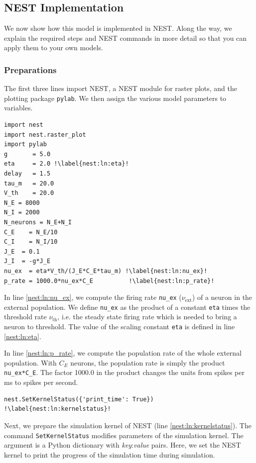 \documentclass{article}
\begin{document}
\subsection{NEST Implementation}\label{nest:sec:brunel_impl}

We now show how this model is implemented in NEST. Along the way, we
explain the required steps and NEST commands in more detail so that
you can apply them to your own models.

\subsubsection{Preparations}
The first three lines import NEST, a NEST module for raster plots, and
the plotting package \lstinline!pylab!. We then assign the various model
parameters to variables.
\begin{lstlisting}[name=Brunel_interactive]
import nest
import nest.raster_plot
import pylab
g       = 5.0 
eta     = 2.0 !\label{nest:ln:eta}!
delay   = 1.5 
tau_m   = 20.0
V_th    = 20.0
N_E = 8000
N_I = 2000
N_neurons = N_E+N_I
C_E    = N_E/10
C_I    = N_I/10
J_E  = 0.1
J_I  = -g*J_E
nu_ex  = eta*V_th/(J_E*C_E*tau_m) !\label{nest:ln:nu_ex}!
p_rate = 1000.0*nu_ex*C_E          !\label{nest:ln:p_rate}!
\end{lstlisting}
In line \ref{nest:ln:nu_ex}, we compute the firing rate
\lstinline!nu_ex! ($\nu_{\text{ext}}$) of a neuron in the external population. We define
\lstinline!nu_ex! as the product of a constant \lstinline!eta! times
the threshold rate $\nu_{\text{th}}$, i.e. the steady state firing
rate which is needed to bring a neuron to threshold. The value of the
scaling constant  \lstinline!eta! is defined in line \ref{nest:ln:eta}.

In line \ref{nest:ln:p_rate}, we compute the population rate of the
whole external population. With $C_E$ neurons, the population rate is
simply the product \lstinline!nu_ex*C_E!. The factor 1000.0 in the
product changes the units from spikes per ms to spikes per second.
 
\begin{lstlisting}[name=Brunel_interactive]
nest.SetKernelStatus({'print_time': True}) !\label{nest:ln:kernelstatus}!
\end{lstlisting}
Next, we prepare the simulation kernel of NEST (line
\ref{nest:ln:kernelstatus}). The command \lstinline!SetKernelStatus!
modifies parameters of the simulation kernel. The argument is a Python
dictionary with \emph{key}:\emph{value} pairs. Here, we set the NEST
kernel to print the progress of the simulation time during simulation.
\end{document}
